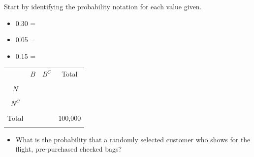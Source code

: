 \documentclass[
]{report}
\providecommand{\tightlist}{%
  \setlength{\itemsep}{0pt}\setlength{\parskip}{0pt}}
\begin{document}

Start by identifying the probability notation for each value given.

\begin{itemize}
\tightlist
\item
  0.30 =
\end{itemize}

\vspace{0.1in}

\begin{itemize}
\tightlist
\item
  0.05 =
\end{itemize}

\vspace{0.1in}

\begin{itemize}
\tightlist
\item
  0.15 =
\end{itemize}

\vspace{0.1in}


\begin{center}
\begin{tabular}{|c|c|c|c|} \hline
\hspace{0.8in} & \hspace{0.35in} $B$ \hspace{.35in} & \hspace{0.35in} $B^C$  \hspace{0.35in} & \hspace{0.3in} Total \hspace{0.3in} \\ 
& & & \\ \hline
$N$& & & \\ 
& & & \\ \hline
$N^C$& & & \\ 
& & & \\ \hline
Total & & & 100,000 \\ 
& & & \\ \hline
\end{tabular}
\end{center}
\vspace{.1in}

\begin{itemize}
\tightlist
\item
  What is the probability that a randomly selected customer who shows for the flight, pre-purchased checked bags?
\end{itemize}
\end{document}

